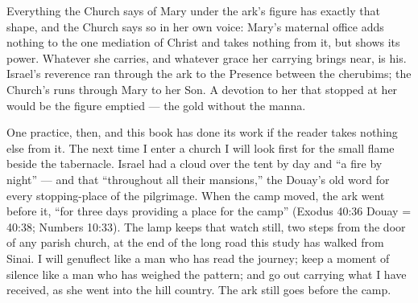 Everything the Church says of Mary under the ark's figure has exactly
that shape, and the Church says so in her own voice: Mary's maternal
office adds nothing to the one mediation of Christ and takes nothing
from it, but shows its power. Whatever she carries, and whatever grace
her carrying brings near, is his.
Israel's reverence ran through the ark to the Presence between the
cherubims; the Church's runs through Mary to her Son. A devotion to
her that stopped at her would be the figure emptied --- the gold
without the manna.

One practice, then, and this book has done its work if the reader
takes nothing else from it. The next time I enter a church I will look
first for the small flame beside the tabernacle. Israel had a cloud
over the tent by day and ``a fire by night'' --- and that ``throughout
all their mansions,'' the Douay's old word for every stopping-place of
the pilgrimage. When the camp moved, the ark went before it, ``for
three days providing a place for the camp'' (Exodus 40:36 Douay =
40:38; Numbers 10:33). The lamp keeps that watch still, two steps from the door of
any parish church, at the end of the long road this study has walked
from Sinai. I will genuflect like a man who has read the journey; keep a moment of
silence like a man who has weighed the pattern; and go out carrying
what I have received, as she went into the hill country.
The ark still goes before the camp.

